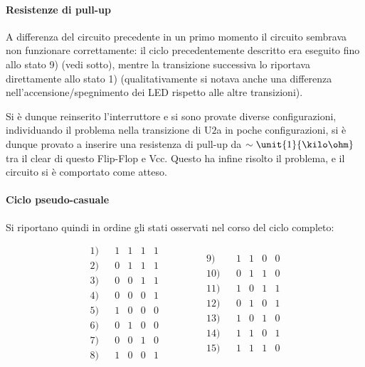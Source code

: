 \documentclass[a4paper,10pt]{article}
\begin{document}
\paragraph{Resistenze di pull-up}A differenza del circuito precedente in un primo momento il circuito sembrava non funzionare correttamente: il ciclo precedentemente descritto era eseguito fino allo stato 9) (vedi sotto), mentre la transizione successiva lo riportava direttamente allo stato 1) (qualitativamente si notava anche una differenza nell'accensione/spegnimento dei LED rispetto alle altre transizioni).

Si è dunque reinserito l'interruttore e si sono provate diverse configurazioni, individuando il problema nella transizione di U$2$a in poche configurazioni, si è dunque provato a inserire una resistenza di pull-up da $\sim \unit{1}{\kilo\ohm}$ tra il clear di questo Flip-Flop e Vcc. 
Questo ha infine risolto il problema, e il circuito si è comportato come atteso.

\paragraph{Ciclo pseudo-casuale} Si riportano quindi in ordine gli stati osservati nel corso del ciclo completo:

\begin{equation*}
\begin{matrix}
1)	&		&	1	&	1	&	1	&	1	\\
2)	&		&	0	&	1	&	1	&	1	\\
3)	&		&	0	&	0	&	1	&	1	\\
4)	&		&	0	&	0	&	0	&	1	\\
5)	&		&	1	&	0	&	0	&	0	\\
6)	&		&	0	&	1	&	0	&	0	\\
7)	&		&	0	&	0	&	1	&	0	\\
8)	&		&	1	&	0	&	0	&	1	\\
\end{matrix}
\qquad \qquad
\begin{matrix}
9)	&		&	1	&	1	&	0	&	0	\\
10)	&		&	0	&	1	&	1	&	0	\\
11)	&		&	1	&	0	&	1	&	1	\\
12)	&		&	0	&	1	&	0	&	1	\\
13)	&		&	1	&	0	&	1	&	0	\\
14)	&		&	1	&	1	&	0	&	1	\\
15)	&		&	1	&	1	&	1	&	0	\\
\end{matrix}
\end{equation*}
\end{document}
